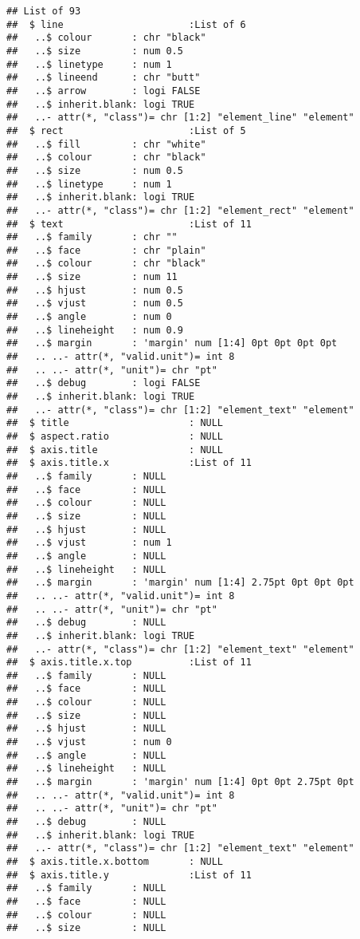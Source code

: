 \documentclass[]{article}
\begin{document}
\begin{verbatim}
## List of 93
##  $ line                      :List of 6
##   ..$ colour       : chr "black"
##   ..$ size         : num 0.5
##   ..$ linetype     : num 1
##   ..$ lineend      : chr "butt"
##   ..$ arrow        : logi FALSE
##   ..$ inherit.blank: logi TRUE
##   ..- attr(*, "class")= chr [1:2] "element_line" "element"
##  $ rect                      :List of 5
##   ..$ fill         : chr "white"
##   ..$ colour       : chr "black"
##   ..$ size         : num 0.5
##   ..$ linetype     : num 1
##   ..$ inherit.blank: logi TRUE
##   ..- attr(*, "class")= chr [1:2] "element_rect" "element"
##  $ text                      :List of 11
##   ..$ family       : chr ""
##   ..$ face         : chr "plain"
##   ..$ colour       : chr "black"
##   ..$ size         : num 11
##   ..$ hjust        : num 0.5
##   ..$ vjust        : num 0.5
##   ..$ angle        : num 0
##   ..$ lineheight   : num 0.9
##   ..$ margin       : 'margin' num [1:4] 0pt 0pt 0pt 0pt
##   .. ..- attr(*, "valid.unit")= int 8
##   .. ..- attr(*, "unit")= chr "pt"
##   ..$ debug        : logi FALSE
##   ..$ inherit.blank: logi TRUE
##   ..- attr(*, "class")= chr [1:2] "element_text" "element"
##  $ title                     : NULL
##  $ aspect.ratio              : NULL
##  $ axis.title                : NULL
##  $ axis.title.x              :List of 11
##   ..$ family       : NULL
##   ..$ face         : NULL
##   ..$ colour       : NULL
##   ..$ size         : NULL
##   ..$ hjust        : NULL
##   ..$ vjust        : num 1
##   ..$ angle        : NULL
##   ..$ lineheight   : NULL
##   ..$ margin       : 'margin' num [1:4] 2.75pt 0pt 0pt 0pt
##   .. ..- attr(*, "valid.unit")= int 8
##   .. ..- attr(*, "unit")= chr "pt"
##   ..$ debug        : NULL
##   ..$ inherit.blank: logi TRUE
##   ..- attr(*, "class")= chr [1:2] "element_text" "element"
##  $ axis.title.x.top          :List of 11
##   ..$ family       : NULL
##   ..$ face         : NULL
##   ..$ colour       : NULL
##   ..$ size         : NULL
##   ..$ hjust        : NULL
##   ..$ vjust        : num 0
##   ..$ angle        : NULL
##   ..$ lineheight   : NULL
##   ..$ margin       : 'margin' num [1:4] 0pt 0pt 2.75pt 0pt
##   .. ..- attr(*, "valid.unit")= int 8
##   .. ..- attr(*, "unit")= chr "pt"
##   ..$ debug        : NULL
##   ..$ inherit.blank: logi TRUE
##   ..- attr(*, "class")= chr [1:2] "element_text" "element"
##  $ axis.title.x.bottom       : NULL
##  $ axis.title.y              :List of 11
##   ..$ family       : NULL
##   ..$ face         : NULL
##   ..$ colour       : NULL
##   ..$ size         : NULL

\end{verbatim}
\end{document}
